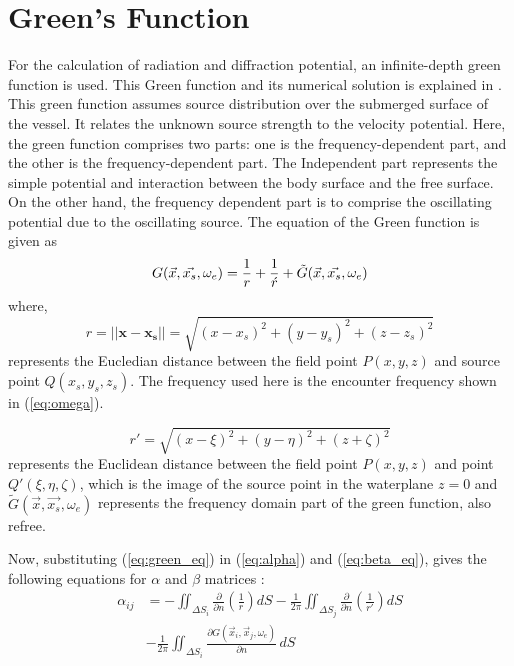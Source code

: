\section{Green's Function}
\label{sec:green_fun}
For the calculation of radiation and diffraction potential, an infinite-depth green function is 
used. This Green function and its numerical solution is explained in \cite{telste1986numerical}. 
This green function assumes source distribution over the submerged surface of the vessel. 
It relates the unknown source strength to the velocity potential. Here, the green function 
comprises two parts: one is the frequency-dependent part, and the other is the 
frequency-dependent part.  The Independent part represents the simple potential 
and interaction between the body surface and the free surface. On the other hand, 
the frequency dependent part is to comprise the oscillating potential due to the 
oscillating source. The equation of the Green function is given as 
\begin{equation}
    \label{eq:green_eq}
    G(\vec{x}, \vec{x_s}, \omega_e) = \frac{1}{r} + \frac{1}{\acute{r}} + \Tilde{G}(\vec{x}, \vec{x_s}, \omega_e) 
\end{equation}
where, 
\begin{equation}
    r = ||\boldsymbol{x} - \boldsymbol{x_s}|| = \sqrt{(x-x_s)^2+(y-y_s)^2+(z-z_s)^2}
\end{equation}
represents the Eucledian distance between the field point $P(x, y, z)$ and source 
point $Q(x_s, y_s, z_s)$. The frequency used here is the encounter frequency shown in 
(\ref{eq:omega}).

\begin{equation}
    r' = \sqrt{(x - \xi)^2 + (y - \eta)^2 + (z + \zeta)^2}   
\end{equation}
represents the Euclidean distance between the field point $P(x, y, z)$ and point 
$Q'(\xi, \eta, \zeta)$, which is the image of the source point in the waterplane 
$z=0$ and $\tilde{G}(\vec{x}, \vec{x_s}, \omega_e)$ represents the frequency domain 
part of the green function, also refree.

Now, substituting (\ref{eq:green_eq}) in (\ref{eq:alpha}) and (\ref{eq:beta_eq}), 
gives the following equations for $\alpha$ and $\beta$ matrices :
\begin{align}
    \alpha_{ij} &= -\iint_{\Delta S_i} \frac{\partial}{\partial n}\left(\frac{1}{r}\right) dS 
    - \frac{1}{2\pi}\iint_{\Delta S_j} \frac{\partial}{\partial n}\left(\frac{1}{r'}\right) dS \\ \nonumber
    &- \frac{1}{2\pi}\iint_{\Delta S_i} \frac{\partial G(\vec{x}_i, \vec{x}_j, \omega_e) }{\partial n}\,dS
\end{align}

